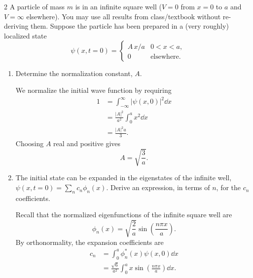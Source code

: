 \documentclass[11pt]{article}
\begin{document}
\begin{problem}{2}
  A particle of mass \(m\) is in an infinite square well (\(V=0\) from \(x=0\) to \(a\) and \(V=\infty\) elsewhere).
  You may use all results from class/textbook without re-deriving them.
  Suppose the particle has been prepared in a (very roughly) localized state
  \begin{equation}
    \label{eq:p2-initial-wavefunction}
    \psi(x,t=0)=
    \begin{cases}
      A\,x/a & 0<x<a,\\
      0 & \text{elsewhere}.
    \end{cases}
  \end{equation}
  \begin{enumerate}[label=(\alph*)]
    \item Determine the normalization constant, \(A\).
\begin{answer}
    We normalize the initial wave function by requiring
    \begin{equation}
      \label{eq:p2-normalization}
      \begin{aligned}
        1
        &= \int_{-\infty}^{\infty}
        |\psi(x,0)|^2\dd{x} \\
        &= \frac{|A|^2}{a^2}\int_0^a x^2\dd{x} \\
        &= \frac{|A|^2a}{3}.
      \end{aligned}
    \end{equation}
    Choosing \(A\) real and positive gives
    \begin{equation}
      \label{eq:p2-A}
      \boxed{A=\sqrt{\frac{3}{a}}}.
    \end{equation}
          \end{answer}
    \item The initial state can be expanded in the eigenstates of the infinite well, \(\psi(x,t=0)=\sum_n c_n\phi_n(x)\).
      Derive an expression, in terms of \(n\), for the \(c_n\) coefficients.
          \begin{answer}
   Recall that the normalized eigenfunctions of the
    infinite square well are
    \begin{equation}
      \label{eq:p2-eigenfunctions}
      \phi_n(x)=\sqrt{\frac{2}{a}}
      \sin\left(\frac{n\pi x}{a}\right).
    \end{equation}
    By orthonormality, the expansion coefficients are
    \begin{equation}
      \label{eq:p2-cn}
      \begin{aligned}
        c_n
        &= \int_0^a \phi_n^*(x)\psi(x,0)\dd{x} \\
        &= \frac{\sqrt{6}}{a^2}
        \int_0^a x\sin\left(\frac{n\pi x}{a}\right)
        \dd{x}.
      \end{aligned}
    \end{equation}


\end{answer}
\end{enumerate}
\end{problem}
\end{document}
